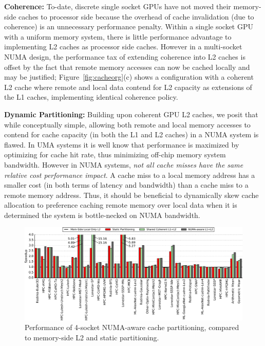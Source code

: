 \textbf{Coherence:} To-date, discrete
single socket GPUs have not moved their memory-side caches to processor side 
because the overhead of cache invalidation (due to coherence) is an 
unnecessary performance penalty.  Within a single socket GPU with a uniform
memory system, there is little performance advantage to implementing L2 caches
as processor side caches.  However in a multi-socket NUMA design, the performance tax
of extending coherence into L2 caches is offset by the fact that remote memory
accesses can now be cached locally and may be justified;
Figure~\ref{fig:cacheorg}(c) shows a configuration with 
a coherent L2 cache where remote and local data contend for L2 capacity as
extensions of the L1 caches, implementing identical coherence policy.

\textbf{Dynamic Partitioning:} Building upon coherent GPU L2 caches, we posit that while 
conceptually simple, allowing both remote and 
local memory accesses to contend for cache capacity (in both the L1 and L2 caches) 
in a NUMA system is flawed. In UMA systems it is well know that performance 
is maximized by optimizing for cache 
hit rate, thus minimizing off-chip memory system bandwidth. However in NUMA systems, 
\textit{not all cache misses have the same relative cost
performance impact}. A cache miss to a local memory address has a 
smaller cost (in both terms of latency and bandwidth) than a cache miss to a 
remote memory address. Thus, it should be beneficial to dynamically 
skew cache allocation to preference caching remote memory over 
local data when it is determined the system is bottle-necked on NUMA bandwidth.

\begin{figure}[t]
    \centering
    \includegraphics[width=1.0\textwidth]{figures/plot_merged_cache_WB.pdf}
    \caption{Performance of 4-socket NUMA-aware cache partitioning, compared to memory-side L2 and static partitioning.}
    \label{fig:dynamiccaching}
        \vspace{-.2in}
\end{figure}

